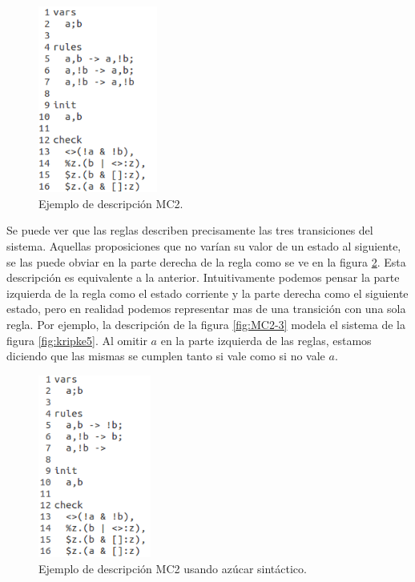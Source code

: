 \begin{figure}[H]
  \centering
  \includegraphics[width=0.35\textwidth]{Figures/modeloMC2-1.png}
  \caption{Ejemplo de descripción MC2.}
  \label{fig:MC2-1}
\end{figure}

\noindent Se puede ver que las reglas describen precisamente las tres transiciones del sistema. Aquellas proposiciones que no varían su valor de un estado al siguiente, se las puede obviar en la parte derecha de la regla como se ve en la figura \ref{fig:MC2-2}. Esta descripción es equivalente a la anterior. Intuitivamente podemos pensar la parte izquierda de la regla como el estado corriente y la parte derecha como el siguiente estado, pero en realidad podemos representar mas de una transición con una sola regla. Por ejemplo, la descripción de la figura \ref{fig:MC2-3} modela el sistema de la figura \ref{fig:kripke5}. Al omitir $a$ en la parte izquierda de las reglas, estamos diciendo que las mismas se cumplen tanto si vale como si no vale $a$.

\begin{figure}[H]
  \centering
  \includegraphics[width=0.33\textwidth]{Figures/modeloMC2-2.png}
  \caption{Ejemplo de descripción MC2 usando azúcar sintáctico.}
  \label{fig:MC2-2}
\end{figure}

